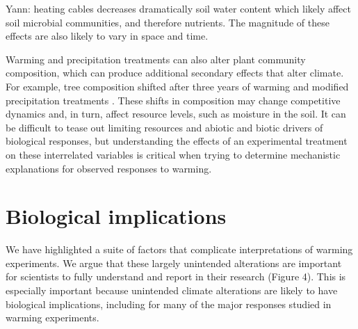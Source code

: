 \documentclass{article}
\begin{document}
Yann: heating cables decreases dramatically soil water content which likely affect soil microbial communities, and therefore nutrients. The magnitude of these effects are also likely to vary in space and time. %

\par Warming and precipitation treatments can also alter plant community composition, which can produce additional secondary effects that alter climate. For example, tree composition shifted after three years of warming and modified precipitation treatments \citep{rollinson2012}. These shifts in composition may change competitive dynamics and, in turn, affect resource levels, such as moisture in the soil.  It can be difficult to tease out limiting resources and abiotic and biotic drivers of biological responses, but understanding the effects of an experimental treatment on these interrelated variables is critical when trying to determine mechanistic explanations for observed responses to warming. %

\section* {Biological implications}
\par We have highlighted a suite of factors that complicate interpretations of warming experiments. We argue that these largely unintended alterations are important for scientists to fully understand and report in their research (Figure 4). This is especially important because unintended climate alterations are likely to have biological implications, including for many of the major responses studied in warming experiments.
\end{document}
